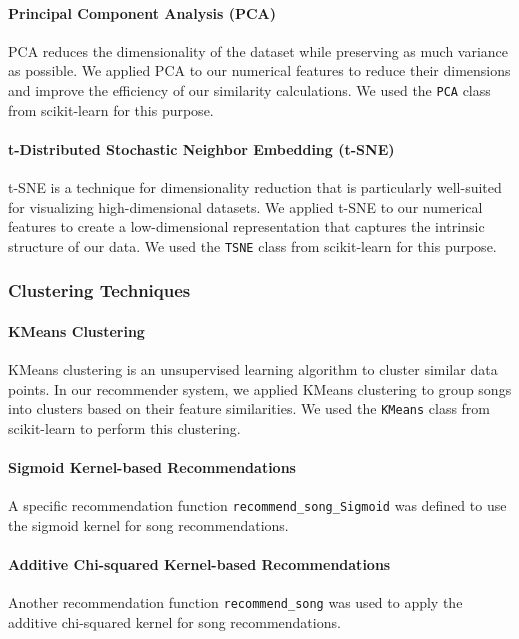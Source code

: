\documentclass[a4paper, 24pt]{article}
\begin{document}
\paragraph{Principal Component Analysis (PCA)}
PCA reduces the dimensionality of the dataset while preserving as much variance as possible. We applied PCA to our numerical features to reduce their dimensions and improve the efficiency of our similarity calculations. We used the \texttt{PCA} class from scikit-learn for this purpose.

\paragraph{t-Distributed Stochastic Neighbor Embedding (t-SNE)}
t-SNE is a technique for dimensionality reduction that is particularly well-suited for visualizing high-dimensional datasets. We applied t-SNE to our numerical features to create a low-dimensional representation that captures the intrinsic structure of our data. We used the \texttt{TSNE} class from scikit-learn for this purpose.

\subsubsection{Clustering Techniques}
\paragraph{KMeans Clustering}
KMeans clustering is an unsupervised learning algorithm to cluster similar data points. In our recommender system, we applied KMeans clustering to group songs into clusters based on their feature similarities. We used the \texttt{KMeans} class from scikit-learn to perform this clustering.

\paragraph{Sigmoid Kernel-based Recommendations}
A specific recommendation function \texttt{recommend\_song\_Sigmoid} was defined to use the sigmoid kernel for song recommendations.

\paragraph{Additive Chi-squared Kernel-based Recommendations}
Another recommendation function \texttt{recommend\_song} was used to apply the additive chi-squared kernel for song recommendations.
\end{document}
